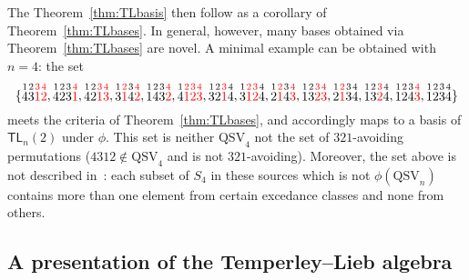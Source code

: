 \documentclass[12pt]{amsart}
\theoremstyle{definition}
\theoremstyle{remark}
\numberwithin{equation}{section}
\newcommand{\TL}{\mathsf{TL}}
\newcommand{\QSV}{\mathrm{QSV}}
\begin{document}
The Theorem~\ref{thm:TLbasis} then follow as a corollary of Theorem~\ref{thm:TLbases}.
In general, however, many bases obtained via Theorem~\ref{thm:TLbases} are novel.  A minimal example can be obtained with $n = 4$: the set 
\[
\{
\stackrel{1}{4} \stackrel{2}{3} \color{red} \stackrel{3}{1} \stackrel{4}{2} \color{black}, 
\stackrel{1}{4} \stackrel{2}{2} \stackrel{3}{3}  \color{red} \stackrel{4}{1} \color{black}, 
\stackrel{1}{4} \stackrel{2}{2}\color{red}  \stackrel{3}{1} \stackrel{4}{3} \color{black}, 
\stackrel{1}{3} \color{red}  \stackrel{2}{1} \color{black} \stackrel{3}{4} \color{red} \stackrel{4}{2}\color{black} , 
\stackrel{1}{1} \stackrel{2}{4} \stackrel{3}{3} \color{red} \stackrel{4}{2} \color{black}, 
\stackrel{1}{4} \color{red} \stackrel{2}{1} \stackrel{3}{2} \stackrel{4}{3} \color{black}, 
\stackrel{1}{3} \stackrel{2}{2} \color{red} \stackrel{3}{1} \color{black} \stackrel{4}{4}, 
\stackrel{1}{3} \color{red} \stackrel{2}{1} \stackrel{3}{2} \color{black} \stackrel{4}{4}, 
\stackrel{1}{2} \color{red} \stackrel{2}{1} \color{black} \stackrel{3}{4} \color{red} \stackrel{4}{3} \color{black}, 
\stackrel{1}{1} \stackrel{2}{3} \color{red} \stackrel{3}{2} \stackrel{4}{3} \color{black}, 
\stackrel{1}{2}  \color{red} \stackrel{2}{1} \color{black} \stackrel{3}{3} \stackrel{4}{4}, 
\stackrel{1}{1} \stackrel{2}{3} \color{red} \stackrel{3}{2} \color{black} \stackrel{4}{4}, 
\stackrel{1}{1} \stackrel{2}{2} \stackrel{3}{4}  \color{red} \stackrel{4}{3} \color{black},
\stackrel{1}{1} \stackrel{2}{2} \stackrel{3}{3} \stackrel{4}{4}
\}
\]
meets the criteria of Theorem~\ref{thm:TLbases}, and accordingly maps to a basis of $\TL_{n}(2)$ under $\phi$. 
This set is neither $\QSV_{4}$ not the set of $321$-avoiding permutations ($4312 \notin \QSV_{4}$ and is not $321$-avoiding).
Moreover, the set above is not described in~\cite{GobetWilliams, Zinno}: each subset of $S_{4}$ in these sources which is not $\phi(\QSV_{n})$ contains more than one element from certain excedance classes and none from others.  


\subsection{A presentation of the Temperley--Lieb algebra}
\label{sec:TLpres}
\end{document}
